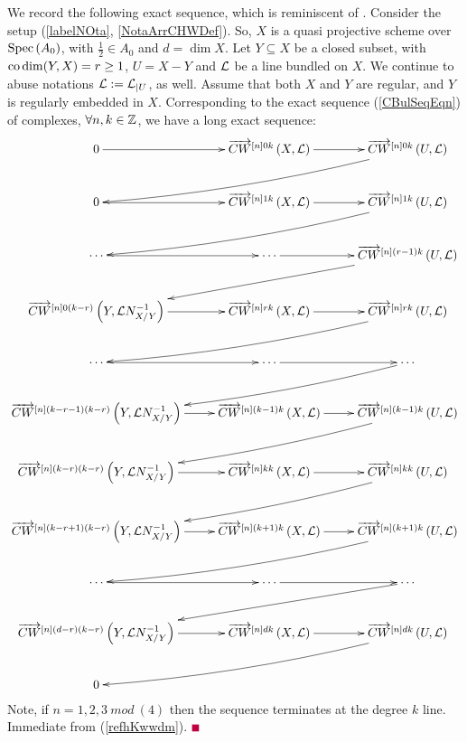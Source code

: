\documentclass[12pt]{article}
\begin{document}

\vspace{3mm}
We record the following  exact sequence, which is  
 reminiscent  of \cite[Rem 10.4.12]{F8}.
\bP\label{LongSiSediSp}{\rm 
Consider the setup (\ref{labelNOta}, \ref{NotaArrCHWDef}). So, $X$ is a quasi projective scheme over $\mathrm{Spec}\left(A_0\right)$, with $\frac{1}{2}\in A_0$ and $d=\dim X$. Let
%
  $Y\subseteq X$ be a closed subset, with $\mathrm{co}\dim(Y, X)=r\geq 1$, $U=X-Y$  and 
${\mathcal{L}}$ be a line bundled on $X$. %
We continue to abuse notations ${\mathcal{L}}:= {\mathcal{L}}_{|U}$, as well.
Assume that both $X$ and $Y$ are regular, and $Y$ is regularly embedded in $X$. 
Corresponding to the exact sequence (\ref{CBulSeqEqn}) of complexes, 
 $\forall n, k\in {\mathbb {Z}}$, we have a long exact sequence:
 \begin{equation}\label{LonSeqEqn1183}
 \diagram
0 \ar[r] &
 \ora{CW}^{\LRt{n}0k}\LRf{X, {\CL}} \ar[r] &  \ora{CW}^{\LRt{n}0k}\LRf{U, {\CL}} \ar@/^/[lld] \\
  0 \ar[r] &
 \ora{CW}^{\LRt{n}1k}\LRf{X, {\CL}} \ar[r] &  \ora{CW}^{\LRt{n}1k}\LRf{U, {\CL}} \ar@/^/[lld] \\
   \cdots \ar[r]& \cdots \ar[r]&  \ora{CW}^{\LRt{n}(r-1)k}\LRf{U, {\CL}}  \ar[dll]\\
%
   \ora{CW}^{\LRt{n}0(k-r)}\LRf{Y, {\CL}N_{X/Y}^{-1}} \ar[r] &
 \ora{CW}^{\LRt{n}rk}\LRf{X, {\CL}} \ar[r] &  \ora{CW}^{\LRt{n}rk}\LRf{U, {\CL}} \ar@/^/[lld] \\
 \cdots \ar[r]& \cdots \ar[r]& \cdots \ar@/^/[dll]\\
 \ora{CW}^{\LRt{n}(k-r-1)(k-r)}\LRf{Y, {\CL}N_{X/Y}^{-1}} \ar[r] &
 \ora{CW}^{\LRt{n}(k-1)k}\LRf{X, {\CL}} \ar[r] &  \ora{CW}^{\LRt{n}(k-1)k}\LRf{U, {\CL}} \ar@/^/[lld] \\
  \ora{CW}^{\LRt{n}(k-r)(k-r)}\LRf{Y, {\CL}N_{X/Y}^{-1}} \ar[r] &
 \ora{CW}^{\LRt{n}kk}\LRf{X, {\CL}} \ar[r] &  \ora{CW}^{\LRt{n}kk}\LRf{U, {\CL}} \ar@/^/[lld] \\
   \ora{CW}^{\LRt{n}\LRf{k-r+1}(k-r)}\LRf{Y, {\CL}N_{X/Y}^{-1}} \ar[r] &
 \ora{CW}^{\LRt{n}\LRf{k+1}k}\LRf{X, {\CL}} \ar[r] &  \ora{CW}^{\LRt{n}\LRf{k+1}k}\LRf{U, {\CL}} \ar@/^/[lld] \\
  \cdots \ar[r]& \cdots \ar[r]& \cdots \ar[dll]\\
  \ora{CW}^{\LRt{n}\LRf{d-r}(k-r)}\LRf{Y, {\CL}N_{X/Y}^{-1}} \ar[r] &
 \ora{CW}^{\LRt{n}dk}\LRf{X, {\CL}} \ar[r] &  \ora{CW}^{\LRt{n}dk}\LRf{U, {\CL}} \ar@/^/[lld] \\
0 &&\\
 \enddiagram
 \end{equation} 
 Note, if $n=1, 2, 3 ~mod~(4)$ then the sequence terminates at the degree $k$ line. 
 }
\eP
\pf Immediate from (\ref{refhKwwdm}).
$\eop$
\end{document}
